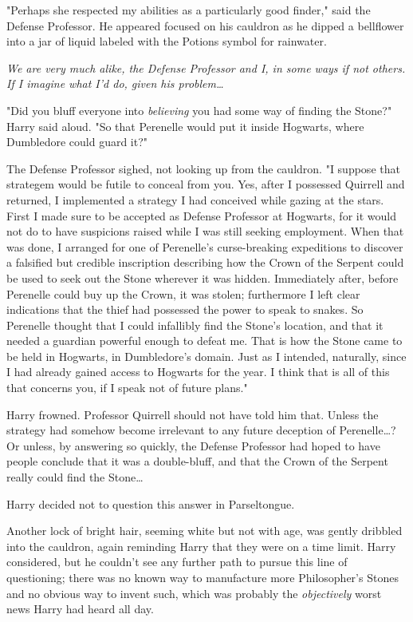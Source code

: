 "Perhaps she respected my abilities as a particularly good finder," said the
Defense Professor. He appeared focused on his cauldron as he dipped a
bellflower into a jar of liquid labeled with the Potions symbol for rainwater.

\emph{We are very much alike, the Defense Professor and I, in some ways if not
others. If I imagine what I'd do, given his problem{\ldots}}

"Did you bluff everyone into \emph{believing} you had some way of finding the
Stone?" Harry said aloud. "So that Perenelle would put it inside Hogwarts,
where Dumbledore could guard it?"

The Defense Professor sighed, not looking up from the cauldron. "I suppose that
strategem would be futile to conceal from you. Yes, after I possessed Quirrell
and returned, I implemented a strategy I had conceived while gazing at the
stars. First I made sure to be accepted as Defense Professor at Hogwarts, for
it would not do to have suspicions raised while I was still seeking employment.
When that was done, I arranged for one of Perenelle's curse-breaking
expeditions to discover a falsified but credible inscription describing how the
Crown of the Serpent could be used to seek out the Stone wherever it was
hidden. Immediately after, before Perenelle could buy up the Crown, it was
stolen; furthermore I left clear indications that the thief had possessed the
power to speak to snakes. So Perenelle thought that I could infallibly find the
Stone's location, and that it needed a guardian powerful enough to defeat me.
That is how the Stone came to be held in Hogwarts, in Dumbledore's domain. Just
as I intended, naturally, since I had already gained access to Hogwarts for the
year. I think that is all of this that concerns you, if I speak not of future
plans."

Harry frowned. Professor Quirrell should not have told him that. Unless the
strategy had somehow become irrelevant to any future deception of
Perenelle{\ldots}? Or unless, by answering so quickly, the Defense Professor
had hoped to have people conclude that it was a double-bluff, and that the
Crown of the Serpent really could find the Stone{\ldots}

Harry decided not to question this answer in Parseltongue.

Another lock of bright hair, seeming white but not with age, was gently
dribbled into the cauldron, again reminding Harry that they were on a time
limit. Harry considered, but he couldn't see any further path to pursue this
line of questioning; there was no known way to manufacture more Philosopher's
Stones and no obvious way to invent such, which was probably the
\emph{objectively} worst news Harry had heard all day.

